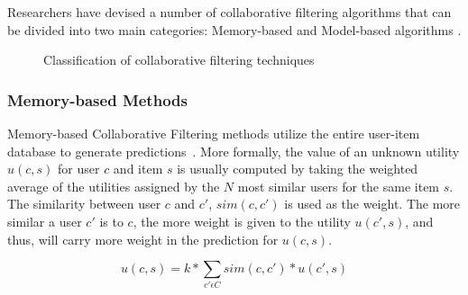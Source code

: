 Researchers have devised a number of collaborative filtering algorithms that
can be divided into two main categories: Memory-based and Model-based
algorithms \cite{Su2009}.

\begin{figure}[H]
    \centering
    \caption[Classification of collaborative filtering techniques]{Classification of collaborative filtering techniques}
    \label{figure:cftaxonomy}
\end{figure}

\subsubsection{Memory-based Methods}
\label{sec:memory-based}

Memory-based Collaborative Filtering methods utilize the entire user-item
database to generate predictions~\cite{Lin1994}. More formally, the value of an unknown
utility $u(c,s)$ for user $c$ and item $s$ is usually computed by taking the
weighted average of the utilities assigned by the $N$ most similar users for
the same item $s$. The similarity between user $c$ and $c'$, $sim(c, c')$ is
used as the weight. The more similar a user $c'$ is to $c$, the more weight is
given to the utility $u(c', s)$, and thus, will carry more weight in the
prediction for $u(c,s)$.

\begin{equation}
\label{equation:cfratingprediction}
u(c,s) = k * \sum_{c' \epsilon C} sim(c, c') * u(c',s)
\end{equation}

